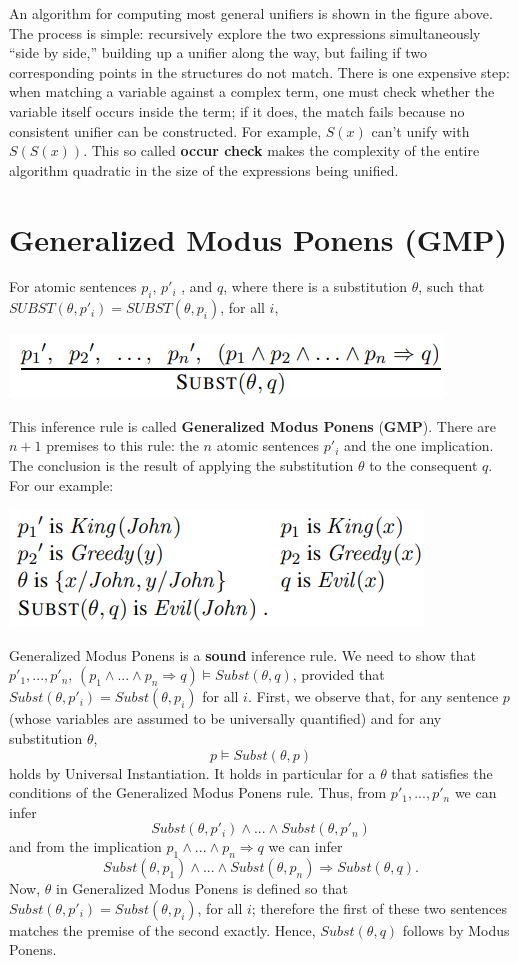 An algorithm for computing most general unifiers is shown in the figure above. The process is simple: recursively explore the two expressions simultaneously “side by side,” building up a unifier along the way, but failing if two corresponding points in the structures do not match. There is one expensive step: when matching a variable against a complex term, one must check whether the variable itself occurs inside the term; if it does, the match fails because no consistent unifier can be constructed. For example, $S(x)$ can’t unify with $S(S(x))$. This so called \textbf{occur check} makes the complexity of the entire algorithm quadratic in the size of the
expressions being unified.

\section{Generalized Modus Ponens (GMP)}
For atomic sentences $p_i$, $p'_i$ , and $q$, where there is a substitution $\theta$, such that $SUBST(\theta, p'_i ) = SUBST(\theta, p_i)$, for all $i$,
\begin{center}
    \includegraphics[]{images/GMP.png}
\end{center}
This inference rule is called \textbf{Generalized Modus Ponens} (\textbf{GMP}). There are $ n + 1$ premises to this rule: the $n$ atomic sentences $p'_i$ and the one implication. The
conclusion is the result of applying the substitution $\theta$ to the consequent $q$. For our example:
\begin{center}
    \includegraphics[]{images/GMP - Example.png}
\end{center}
Generalized Modus Ponens is a \textbf{sound} inference rule. We need to show that $p'_1, ..., p'_n, \, (p_1 \land ... \land p_n \Rightarrow q) \vDash Subst(\theta, q)$, provided that $Subst(\theta, p'_i) = Subst(\theta, p_i)$ for all $i$. First, we observe
that, for any sentence $p$ (whose variables are assumed to be universally quantified) and for any substitution $\theta$, 
\[p \vDash Subst(\theta, p)\]
holds by Universal Instantiation. It holds in particular for a $\theta$ that satisfies the conditions of the Generalized Modus Ponens rule. Thus, from $p'_1, ..., p'_n$ we can infer
\[Subst(\theta, p'_i) \land ... \land Subst(\theta, p'_n)\]
and from the implication $p_1 \land ... \land p_n \Rightarrow q$ we can infer
\[Subst(\theta, p_1) \land ... \land Subst(\theta, p_n) \Rightarrow Subst(\theta, q).
\]
Now, $\theta$ in Generalized Modus Ponens is defined so that $Subst(\theta, p'_i) = Subst(\theta, p_i)$, for all $i$; therefore the first of these two sentences matches the premise of the second exactly. Hence, $Subst(\theta, q)$ follows by Modus Ponens.

